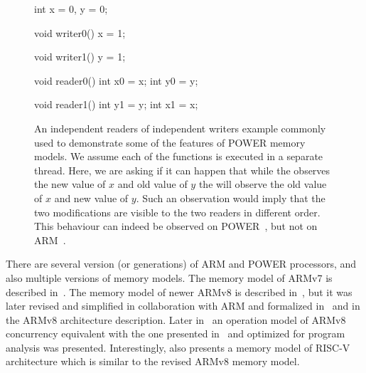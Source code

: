 \begin{figure}[tp]
    \begin{cppcode}
        int x = 0, y = 0;
    \end{cppcode}
    \begin{multicols}{4}
        \begin{cppcode}
          void writer0()
          {
            x = 1;
          }
        \end{cppcode}
        \columnbreak
        \begin{cppcode}
          void writer1()
          {
            y = 1;
          }
        \end{cppcode}
        \columnbreak
        \begin{cppcode}
          void reader0()
          {
            int x0 = x;
            int y0 = y;
          }
        \end{cppcode}
        \columnbreak
        \begin{cppcode}
          void reader1()
          {
            int y1 = y;
            int x1 = x;
          }
        \end{cppcode}
    \end{multicols}
    \caption{
        An independent readers of independent writers example commonly used to
        demonstrate some of the features of POWER memory models.
        We assume each of the functions is executed in a separate thread.
        Here, we are asking if it can happen that while the 
        observes the new value of $x$ and old value of $y$ the 
        will observe the old value of $x$ and new value of $y$.
        Such an observation would imply that the two modifications are visible
        to the two readers in different order.
        This behaviour can indeed be observed on POWER~\cite{TODO}, but not on
        ARM~\cite{Pulte2017}.
    }\label{fig:prelim:iriw}
\end{figure}

There are several version (or generations) of ARM and POWER processors, and
also multiple versions of memory models.
The memory model of ARMv7 is described in~\cite{Alglave2014}.
The memory model of newer ARMv8 is described in~\cite{Flur2016}, but it was
later revised and simplified in collaboration with ARM and formalized
in~\cite{Pulte2017} and in the ARMv8 architecture description.
Later in~\cite{Pulte2019} an operation model of ARMv8 concurrency equivalent
with the one presented in~\cite{Pulte2017} and optimized for program analysis
was presented.
Interestingly, \cite{Pulte2019} also presents a memory model of RISC-V
architecture which is similar to the revised ARMv8 memory model.

